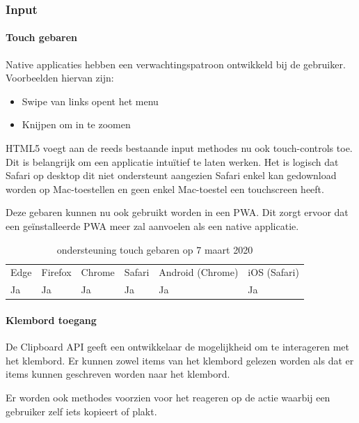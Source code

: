 	
	
	\subsubsection{Input}
	
	\paragraph{Touch gebaren}
	
	Native applicaties hebben een verwachtingspatroon ontwikkeld bij de gebruiker. Voorbeelden hiervan zijn:
	
	 \begin{itemize}
		\item	Swipe van links opent het menu
		\item	Knijpen om in te zoomen
	\end{itemize}
	
	HTML5 voegt aan de reeds bestaande input methodes nu ook touch-controls toe. Dit is belangrijk om een applicatie intuïtief te laten werken. Het is logisch dat Safari op desktop dit niet ondersteunt aangezien Safari enkel kan gedownload worden op Mac-toestellen en geen enkel Mac-toestel een touchscreen heeft.
	
	Deze gebaren kunnen nu ook gebruikt worden in een PWA. Dit zorgt ervoor dat een geïnstalleerde PWA meer zal aanvoelen als een native applicatie.
	
	\begin{table}[H]
		\centering
		\begin{tabular}{llllll}
			Edge & Firefox & Chrome & Safari & Android (Chrome) & iOS (Safari) \\
			Ja   & Ja      &  Ja     & Ja     & Ja               & Ja          
		\end{tabular}	
		\caption{ondersteuning touch gebaren op 7 maart 2020}
	\end{table}	
	
	\paragraph{Klembord toegang}
	De Clipboard API \autocite{Kacmarcik2019} geeft een ontwikkelaar de mogelijkheid om te interageren met het klembord. Er kunnen zowel items van het klembord gelezen worden als dat er items kunnen geschreven worden naar het klembord.
	
	Er worden ook methodes voorzien voor het reageren op de actie waarbij een gebruiker zelf iets kopieert of plakt. 
	
